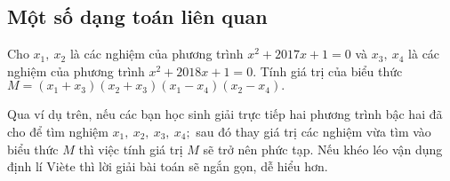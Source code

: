 \subsection{Một số dạng toán liên quan}

\begin{vd}%
Cho $x_1,~x_2$ là các nghiệm của phương trình $x^2+2017x+1=0$ và $x_3,~x_4$ là các nghiệm của phương trình $x^2+2018x+1=0.$ Tính giá trị của biểu thức $M=(x_1+x_3)(x_2+x_3)(x_1-x_4)(x_2-x_4).$
\end{vd}
 Qua ví dụ trên, nếu các bạn học sinh giải trực tiếp hai phương trình bậc hai đã cho để tìm nghiệm $x_1,~x_2,~x_3,~x_4;$ sau đó thay giá trị các nghiệm vừa tìm vào biểu thức $M$ thì việc tính giá trị $M$ sẽ trở nên phức tạp. Nếu khéo léo vận dụng định lí Viète thì lời giải bài toán sẽ ngắn gọn, dễ hiểu hơn.


